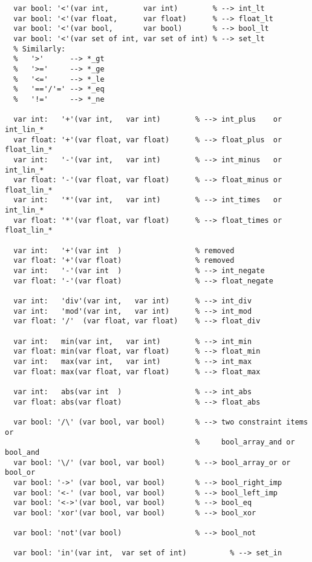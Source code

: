 \documentclass[10pt]{article}
\begin{document}
\begin{verbatim}
  var bool: '<'(var int,        var int)        % --> int_lt
  var bool: '<'(var float,      var float)      % --> float_lt
  var bool: '<'(var bool,       var bool)       % --> bool_lt
  var bool: '<'(var set of int, var set of int) % --> set_lt
  % Similarly:
  %   '>'      --> *_gt
  %   '>='     --> *_ge
  %   '<='     --> *_le
  %   '=='/'=' --> *_eq
  %   '!='     --> *_ne

  var int:   '+'(var int,   var int)        % --> int_plus    or int_lin_*
  var float: '+'(var float, var float)      % --> float_plus  or float_lin_*
  var int:   '-'(var int,   var int)        % --> int_minus   or int_lin_*
  var float: '-'(var float, var float)      % --> float_minus or float_lin_*
  var int:   '*'(var int,   var int)        % --> int_times   or int_lin_*
  var float: '*'(var float, var float)      % --> float_times or float_lin_*

  var int:   '+'(var int  )                 % removed
  var float: '+'(var float)                 % removed
  var int:   '-'(var int  )                 % --> int_negate
  var float: '-'(var float)                 % --> float_negate

  var int:   'div'(var int,   var int)      % --> int_div
  var int:   'mod'(var int,   var int)      % --> int_mod
  var float: '/'  (var float, var float)    % --> float_div

  var int:   min(var int,   var int)        % --> int_min
  var float: min(var float, var float)      % --> float_min
  var int:   max(var int,   var int)        % --> int_max
  var float: max(var float, var float)      % --> float_max

  var int:   abs(var int  )                 % --> int_abs
  var float: abs(var float)                 % --> float_abs

  var bool: '/\' (var bool, var bool)       % --> two constraint items or
                                            %     bool_array_and or bool_and
  var bool: '\/' (var bool, var bool)       % --> bool_array_or or bool_or
  var bool: '->' (var bool, var bool)       % --> bool_right_imp
  var bool: '<-' (var bool, var bool)       % --> bool_left_imp
  var bool: '<->'(var bool, var bool)       % --> bool_eq
  var bool: 'xor'(var bool, var bool)       % --> bool_xor

  var bool: 'not'(var bool)                 % --> bool_not

  var bool: 'in'(var int,  var set of int)          % --> set_in


\end{verbatim}
\end{document}

